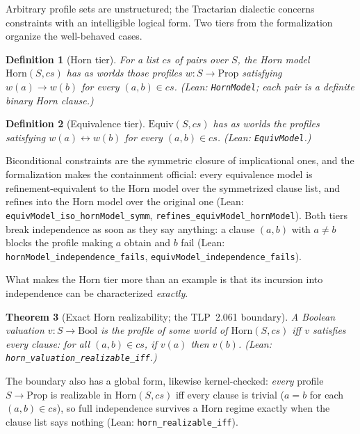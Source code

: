 \documentclass[10pt, letterpaper]{article}
\newtheorem{theorem}{Theorem}[section]
\newtheorem{definition}[theorem]{Definition}
\theoremstyle{remark}
\newcommand{\lean}[1]{\texttt{#1}}
\newcommand{\TLP}[1]{TLP~#1}
\begin{document}
Arbitrary profile sets are unstructured; the Tractarian dialectic concerns
constraints with an intelligible logical form. Two tiers from the
formalization organize the well-behaved cases.

\begin{definition}[Horn tier]\label{def:horn}
For a list $\mathit{cs}$ of pairs over $S$, the \emph{Horn model}
$\mathrm{Horn}(S, \mathit{cs})$ has as worlds those profiles
$w : S \to \mathrm{Prop}$ satisfying $w(a) \to w(b)$ for every
$(a, b) \in \mathit{cs}$. (Lean: \lean{HornModel}; each pair is a definite
binary Horn clause.)
\end{definition}

\begin{definition}[Equivalence tier]\label{def:equiv}
$\mathrm{Equiv}(S, \mathit{cs})$ has as worlds the profiles satisfying
$w(a) \leftrightarrow w(b)$ for every $(a, b) \in \mathit{cs}$. (Lean:
\lean{EquivModel}.)
\end{definition}

Biconditional constraints are the symmetric closure of implicational ones,
and the formalization makes the containment official: every equivalence model
is refinement-equivalent to the Horn model over the symmetrized clause list,
and refines into the Horn model over the original one (Lean:
\lean{equivModel\_iso\_hornModel\_symm}, \lean{refines\_equivModel\_hornModel}).
Both tiers break independence as soon as they say anything: a clause
$(a, b)$ with $a \neq b$ blocks the profile making $a$ obtain and $b$ fail
(Lean: \lean{hornModel\_independence\_fails},
\lean{equivModel\_independence\_fails}).

What makes the Horn tier more than an example is that its incursion into
independence can be characterized \emph{exactly}.

\begin{theorem}[Exact Horn realizability; the \TLP{2.061} boundary]
\label{thm:horn-boundary}
A Boolean valuation $v : S \to \mathrm{Bool}$ is the profile of some world of
$\mathrm{Horn}(S, \mathit{cs})$ iff $v$ satisfies every clause: for all
$(a, b) \in \mathit{cs}$, if $v(a)$ then $v(b)$. (Lean:
\lean{horn\_valuation\_realizable\_iff}.)
\end{theorem}

The boundary also has a global form, likewise kernel-checked: \emph{every}
profile $S \to \mathrm{Prop}$ is realizable in $\mathrm{Horn}(S, \mathit{cs})$
iff every clause is trivial ($a = b$ for each $(a, b) \in \mathit{cs}$), so
full independence survives a Horn regime exactly when the clause list says
nothing (Lean: \lean{horn\_realizable\_iff}).
\end{document}
